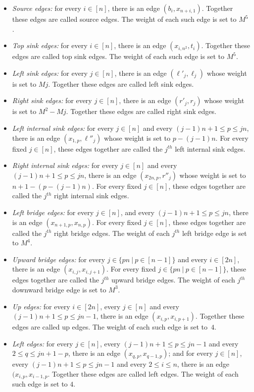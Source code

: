 \begin{itemize}
\item \emph{Source edges:} for every $i \in [n]$, there is an edge $(b_i,x_{n+i,1})$. Together these edges are called source edges. The weight of each such edge is set to $M^5$.
\item \emph{Top sink edges:} for every $i \in [n]$, there is an edge $(x_{i,n^2},t_i)$. Together these edges are called top sink edges. The weight of each such edge is set to $M^5$.
\item \emph{Left sink edges:} for every $j \in [n]$, there is an edge $(\ell'_j,\ell_j)$ whose weight is set to $Mj$. Together these edges are called left sink edges.
\item  \emph{Right sink edges:} for every $j \in [n]$, there is an edge $(r'_j,r_j)$ whose weight is set to $M^2-Mj$. Together these edges are called right sink edges. 
\item \emph{Left internal sink edges:} for every $j \in [n]$ and every $(j-1)n+1 \leq p \leq jn$, there is an edge $(x_{1,p},\ell''_j)$ whose weight is set to $p-(j-1)n$. For every fixed $j \in [n]$, these edges together are called the $j^{th}$ left internal sink edges.
\item \emph{Right internal sink edges:} for every $j \in [n]$ and every $(j-1)n + 1 \leq p \leq jn$, there is an edge $(x_{2n,p},r''_j)$ whose weight is set to $n+1-(p-(j-1)n)$. For every fixed $j \in [n]$, these edges together are called the $j^{th}$ right internal sink edges.
\item \emph{Left bridge edges:} for every $j \in [n]$, and every $(j-1)n + 1 \leq p \leq jn$, there is an edge $(x_{n+1,p},x_{n,p})$. For every fixed $j \in [n]$, these edges together are called the $j^{th}$ right bridge edges. The weight of each $j^{th}$ left bridge edge is set to $M^4$.
\item \emph{Upward bridge edges:} for every $j \in \{pn~|~p \in [n-1]\}$ and every $i \in [2n]$, there is an edge $(x_{i,j},x_{i,j+1})$. For every fixed $j \in \{pn~|~p \in [n-1]\}$, these edges together are called the $j^{th}$ upward bridge edges. The weight of each $j^{th}$ downward bridge edge is set to $M^3$.
\item \emph{Up edges:} for every $i \in [2n]$, every $j \in [n]$ and every $(j-1)n + 1 \leq p \leq jn-1$, there is an edge $(x_{i,p},x_{i,p+1})$. Together these edges are called up edges. The weight of each such edge is set to~$4$.
\item \emph{Left edges:} for every $j \in [n]$, every $(j-1)n+1 \leq p \leq jn-1$ and every $2 \leq q \leq jn+1-p$, there is an edge $(x_{q,p},x_{q-1,p})$; and for every $j \in [n]$, every $(j-1)n+1 \leq p \leq jn-1$ and every $2 \leq i \leq n$, there is an edge $(x_{i,p},x_{i-1,p}$. Together these edges are called left edges. The weight of each such edge is set to $4$.

\end{itemize}
